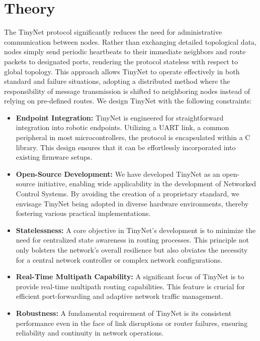 \section{Theory}
The TinyNet protocol significantly reduces the need for administrative communication between nodes. Rather than exchanging detailed topological data, nodes simply send periodic heartbeats to their immediate neighbors and route packets to designated ports, rendering the protocol stateless with respect to global topology. This approach allows TinyNet to operate effectively in both standard and failure situations, adopting a distributed method where the responsibility of message transmission is shifted to neighboring nodes instead of relying on pre-defined routes.
We design TinyNet with the following constraints:
\begin{itemize}
	\item \textbf{Endpoint Integration:} TinyNet is engineered for straightforward integration into robotic endpoints. Utilizing a UART link, a common peripheral in most microcontrollers, the protocol is encapsulated within a C library. This design ensures that it can be effortlessly incorporated into existing firmware setups.
	\item \textbf{Open-Source Development:} We have developed TinyNet as an open-source initiative, enabling wide applicability in the development of Networked Control Systems. By avoiding the creation of a proprietary standard, we envisage TinyNet being adopted in diverse hardware environments, thereby fostering various practical implementations.
	\item \textbf{Statelessness:} A core objective in TinyNet's development is to minimize the need for centralized state awareness in routing processes. This principle not only bolsters the network's overall resilience but also obviates the necessity for a central network controller or complex network configurations.
	\item \textbf{Real-Time Multipath Capability:} A significant focus of TinyNet is to provide real-time multipath routing capabilities. This feature is crucial for efficient port-forwarding and adaptive network traffic management.
	\item \textbf{Robustness:} A fundamental requirement of TinyNet is its consistent performance even in the face of link disruptions or router failures, ensuring reliability and continuity in network operations.
\end{itemize}

